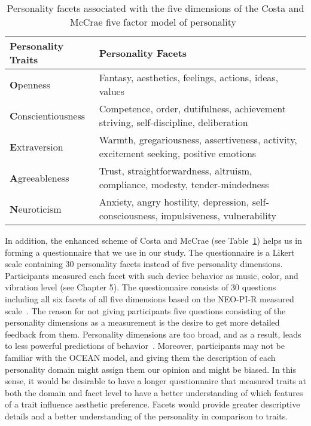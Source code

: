 \begin{table} [h]
    \centering
    \begin{tabular}{ | m{8em} | m{25em}| }
        \hline
        \textbf{Personality Traits} & \textbf{Personality Facets}  \\
        \hline
        \textbf{O}penness & Fantasy, aesthetics, feelings, actions, ideas, values  \\
        \hline
        \textbf{C}onscientiousness & Competence, order, dutifulness, achievement striving, self-discipline, deliberation  \\
        \hline
        \textbf{E}xtraversion & Warmth, gregariousness, assertiveness, activity, excitement seeking, positive emotions \\
        \hline
        \textbf{A}greeableness & Trust, straightforwardness, altruism, compliance, modesty, tender-mindedness  \\
        \hline
        \textbf{N}euroticism & Anxiety, angry hostility, depression, self-consciousness, impulsiveness, vulnerability \\
        \hline
    \end{tabular}
    \caption{Personality facets associated with the five dimensions of the Costa and McCrae five factor model of personality~\cite{costa2008revised, matthews2003personality}}
    \label{table:personality}
\end{table}

In addition, the enhanced scheme of Costa and McCrae (see Table~\ref{table:personality})
helps us in forming a questionnaire that we use in our study.
The questionnaire is a Likert scale containing 30 personality facets instead of five personality dimensions.
Participants measured each facet with such device behavior as music, color, and vibration level (see Chapter 5).
The questionnaire consists of 30 questions including all six facets of
all five dimensions based on the NEO-PI-R measured scale~\cite{costa2008revised}.
The reason for not giving participants five questions consisting of the personality
dimensions as a measurement is the desire to get more detailed feedback from them.
Personality dimensions are too broad, and as a result, leads to less powerful predictions of behavior~\cite{paunonen2001big}.
Moreover, participants may not be familiar with the OCEAN model, and giving them the description
of each personality domain might assign them our opinion and might be biased.
In this sense, it would be desirable to have a longer questionnaire that measured traits at both the
domain and facet level to have a better understanding of which features of a trait influence aesthetic preference.
Facets would provide greater descriptive details and a better understanding of the personality in comparison to traits.

